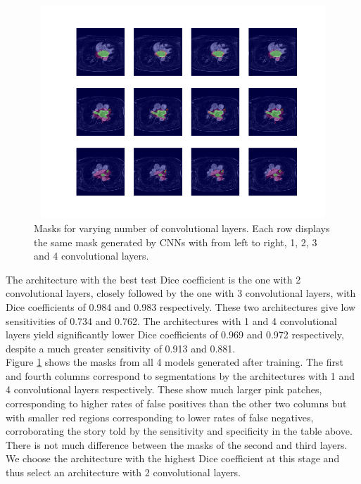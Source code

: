 \begin{figure}
\centering
\includegraphics[trim=2.5cm 1.5cm 2cm 1.5cm, clip=true, height=80mm, width=150mm]{Chapter3/mask_results_varying_number_of_convolutional_layers.png}
\caption{Masks for varying number of convolutional layers. Each row displays the same mask generated by CNNs with from left to right, 1, 2, 3 and 4 convolutional layers.}
\label{mask_varying_conv_layers}
\end{figure}

\noindent The architecture with the best test Dice coefficient is the one with 2 convolutional layers, closely followed by the one with 3 convolutional layers, with Dice coefficients of 0.984 and 0.983 respectively. These two architectures give low sensitivities of 0.734 and 0.762. The architectures with 1 and 4 convolutional layers yield significantly lower Dice coefficients of 0.969 and 0.972 respectively, despite a much greater sensitivity of 0.913 and 0.881. \\

\noindent Figure \ref{mask_varying_conv_layers} shows the masks from all 4 models generated after training. The first and fourth columns correspond to segmentations by the architectures with 1 and 4 convolutional layers respectively. These show much larger pink patches, corresponding to higher rates of false positives than the other two columns but with smaller red regions corresponding to lower rates of false negatives, corroborating the story told by the sensitivity and specificity in the table above. There is not much difference between the masks of the second and third layers.\\

\noindent We choose the architecture with the highest Dice coefficient at this stage and thus select an architecture with 2 convolutional layers. 

